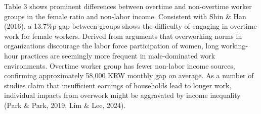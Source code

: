 \documentclass[
  12pt,
]{article}
\begin{document}
\begin{table}[!h]
\centering\centering
\caption{\label{tab:unnamed-chunk-8}Summary Statistics of Demographic Characteristics}
\centering
{}
\end{table}

Table 3 shows prominent differences between overtime and non-overtime
worker groups in the female ratio and non-labor income. Consistent with
Shin \& Han (2016), a 13.7\%p gap between groups shows the difficulty of
engaging in overtime work for female workers. Derived from arguments
that overworking norms in organizations discourage the labor force
participation of women, long working-hour practices are seemingly more
frequent in male-dominated work environments. Overtime worker group has
fewer non-labor income sources, confirming approximately 58,000 KRW
monthly gap on average. As a number of studies claim that insufficient
earnings of households lead to longer work, individual impacts from
overwork might be aggravated by income inequality (Park \& Park, 2019;
Lim \& Lee, 2024).
\end{document}
